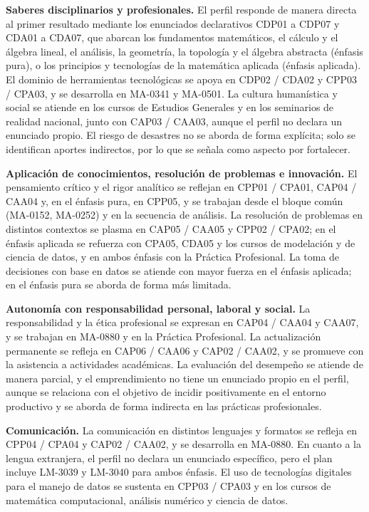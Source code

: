 \documentclass[11pt,a4paper]{article}
\begin{document}
\textbf{Saberes disciplinarios y profesionales.} El perfil responde de manera directa al primer resultado mediante los enunciados declarativos CDP01 a CDP07 y CDA01 a CDA07, que abarcan los fundamentos matemáticos, el cálculo y el álgebra lineal, el análisis, la geometría, la topología y el álgebra abstracta (énfasis pura), o los principios y tecnologías de la matemática aplicada (énfasis aplicada). El dominio de herramientas tecnológicas se apoya en CDP02 / CDA02 y CPP03 / CPA03, y se desarrolla en MA-0341 y MA-0501. La cultura humanística y social se atiende en los cursos de Estudios Generales y en los seminarios de realidad nacional, junto con CAP03 / CAA03, aunque el perfil no declara un enunciado propio. El riesgo de desastres no se aborda de forma explícita; solo se identifican aportes indirectos, por lo que se señala como aspecto por fortalecer.

\textbf{Aplicación de conocimientos, resolución de problemas e innovación.} El pensamiento crítico y el rigor analítico se reflejan en CPP01 / CPA01, CAP04 / CAA04 y, en el énfasis pura, en CPP05, y se trabajan desde el bloque común (MA-0152, MA-0252) y en la secuencia de análisis. La resolución de problemas en distintos contextos se plasma en CAP05 / CAA05 y CPP02 / CPA02; en el énfasis aplicada se refuerza con CPA05, CDA05 y los cursos de modelación y de ciencia de datos, y en ambos énfasis con la Práctica Profesional. La toma de decisiones con base en datos se atiende con mayor fuerza en el énfasis aplicada; en el énfasis pura se aborda de forma más limitada.

\textbf{Autonomía con responsabilidad personal, laboral y social.} La responsabilidad y la ética profesional se expresan en CAP04 / CAA04 y CAA07, y se trabajan en MA-0880 y en la Práctica Profesional. La actualización permanente se refleja en CAP06 / CAA06 y CAP02 / CAA02, y se promueve con la asistencia a actividades académicas. La evaluación del desempeño se atiende de manera parcial, y el emprendimiento no tiene un enunciado propio en el perfil, aunque se relaciona con el objetivo de incidir positivamente en el entorno productivo y se aborda de forma indirecta en las prácticas profesionales.

\textbf{Comunicación.} La comunicación en distintos lenguajes y formatos se refleja en CPP04 / CPA04 y CAP02 / CAA02, y se desarrolla en MA-0880. En cuanto a la lengua extranjera, el perfil no declara un enunciado específico, pero el plan incluye LM-3039 y LM-3040 para ambos énfasis. El uso de tecnologías digitales para el manejo de datos se sustenta en CPP03 / CPA03 y en los cursos de matemática computacional, análisis numérico y ciencia de datos.
\end{document}
